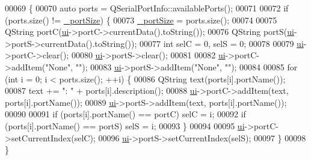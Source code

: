 \begin{DoxyCode}
00069 \{
00070     \textcolor{keyword}{auto} ports = QSerialPortInfo::availablePorts();
00071     
00072     \textcolor{keywordflow}{if} (ports.size() != \hyperlink{class_options_window_a9bd4dccc7a544b1db78dc8cf330b88f6}{\_portSize}) \{
00073         \hyperlink{class_options_window_a9bd4dccc7a544b1db78dc8cf330b88f6}{\_portSize} = ports.size();
00074         
00075         QString portC(\hyperlink{class_options_window_a8347442d5b3b670e8fff0c4102db1f88}{ui}->portC->currentData().toString());
00076         QString portS(\hyperlink{class_options_window_a8347442d5b3b670e8fff0c4102db1f88}{ui}->portS->currentData().toString());
00077         \textcolor{keywordtype}{int} selC = 0, selS = 0;
00078         
00079         \hyperlink{class_options_window_a8347442d5b3b670e8fff0c4102db1f88}{ui}->portC->clear();
00080         \hyperlink{class_options_window_a8347442d5b3b670e8fff0c4102db1f88}{ui}->portS->clear();
00081         
00082         \hyperlink{class_options_window_a8347442d5b3b670e8fff0c4102db1f88}{ui}->portC->addItem(\textcolor{stringliteral}{"None"}, \textcolor{stringliteral}{""});
00083         \hyperlink{class_options_window_a8347442d5b3b670e8fff0c4102db1f88}{ui}->portS->addItem(\textcolor{stringliteral}{"None"}, \textcolor{stringliteral}{""});
00084         
00085         \textcolor{keywordflow}{for} (\textcolor{keywordtype}{int} i = 0; i < ports.size(); ++i) \{
00086             QString text(ports[i].portName());
00087             text += \textcolor{stringliteral}{": "} + ports[i].description();
00088             \hyperlink{class_options_window_a8347442d5b3b670e8fff0c4102db1f88}{ui}->portC->addItem(text, ports[i].portName());
00089             \hyperlink{class_options_window_a8347442d5b3b670e8fff0c4102db1f88}{ui}->portS->addItem(text, ports[i].portName());
00090             
00091             \textcolor{keywordflow}{if} (ports[i].portName() == portC) selC = i;
00092             \textcolor{keywordflow}{if} (ports[i].portName() == portS) selS = i;
00093         \}
00094         
00095         \hyperlink{class_options_window_a8347442d5b3b670e8fff0c4102db1f88}{ui}->portC->setCurrentIndex(selC);
00096         \hyperlink{class_options_window_a8347442d5b3b670e8fff0c4102db1f88}{ui}->portS->setCurrentIndex(selS);
00097     \}
00098 \}
\end{DoxyCode}
\hypertarget{class_options_window_ae8c0373be58da710194f8d14f1c3c4dc}{}

